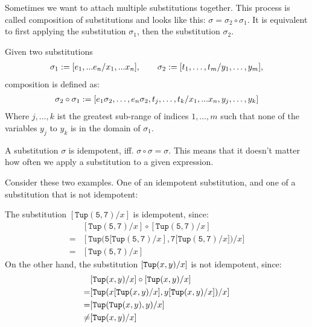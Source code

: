 \documentclass[twoside,12pt,a4paper]{article}
\begin{document}
Sometimes we want to attach multiple substitutions together.
This process is called composition of substitutions and looks like this: $\sigma = \sigma_2 \circ \sigma_1$.
It is equivalent to first applying the substitution $\sigma_1$, then the substitution $\sigma_2$.

\begin{definition}
    Given two substitutions
    \begin{align*}
        \sigma_1 := [e_1,...e_n/x_1,...x_n],\qquad \sigma_2 := [t_1,\dots,t_m/y_1,\dots,y_m],
    \end{align*}
    composition is defined as:
    \begin{align*}
        \sigma_2\circ\sigma_1 := [e_1\sigma_2,\dots,e_n\sigma_2,t_j,\dots,t_k/x_1,...x_n,y_j,\dots,y_k]
    \end{align*}
    Where $j, \dots, k$ ist the greatest sub-range of indices $1,\dots,m$ such that none of the variables $y_j$ to $y_k$ is in the domain of $\sigma_1$. 
\end{definition}

\begin{definition}[Idempotency]
    A substitution $\sigma$ is idempotent, iff. $\sigma \circ \sigma = \sigma$.
    This means that it doesn't matter how often we apply a substitution to a given expression.
\end{definition}

Consider these two examples. One of an idempotent substitution, and one of a substitution that is not idempotent:
\begin{example}[Idempotency]
    The substitution $[\mathtt{Tup(5, 7)}/x]$ is idempotent, since:
    \begin{align*}
        &[\mathtt{Tup(5, 7)}/x] \circ [\mathtt{Tup(5, 7)}/x]\\
        =& [\mathtt{Tup(5[Tup(5, 7)}/x], \mathtt{7[Tup(5, 7)}/x])/x]\\
        =& [\mathtt{Tup(5, 7)}/x]
    \end{align*}
    On the other hand, the substitution $[\mathtt{Tup(}x, y\mathtt{)}/x]$ is not idempotent, since:
    \begin{align*}
        &[\mathtt{Tup(}x, y\mathtt{)}/x]\circ [\mathtt{Tup(}x, y\mathtt{)}/x]\\
        =& [\mathtt{Tup(}x[\mathtt{Tup(}x, y\mathtt{)}/x], y[\mathtt{Tup(}x, y\mathtt{)}/x]\mathtt{)}/x]\\
        =& [\mathtt{Tup(}\mathtt{Tup(}x, y\mathtt{)}, y\mathtt{)}/x]\\
        \neq& [\mathtt{Tup(}x, y\mathtt{)}/x]
    \end{align*}
\end{example} %
\end{document}
